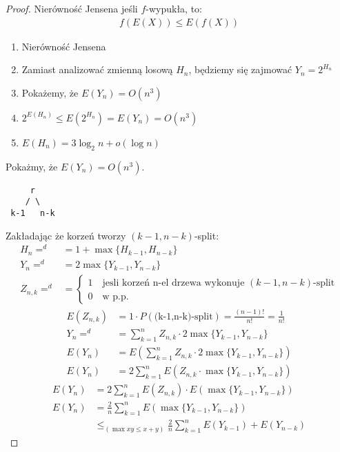 \documentclass{article}
\numberwithin{equation}{subsection}
\begin{document}
\begin{proof}
Nierówność Jensena jeśli $f$-wypukła, to:
\begin{align}
    f(E(X)) \leq E(f(X))
\end{align}

\begin{enumerate}
    \item Nierówność Jensena
    \item Zamiast analizować zmienną losową $H_n$, będziemy się zajmować $Y_n=2^{H_n}$
    \item Pokażemy, że $E(Y_n) = O(n^3)$
    \item $2^{E(H_n)} \leq E(2^{H_n}) = E(Y_n) = O(n^3)$
    \item $E(H_n) = 3\log_2 n + o(\log n)$
\end{enumerate}
Pokażmy, że $E(Y_n) = O(n^3)$.
\begin{verbatim}
     r
    / \
 k-1   n-k
\end{verbatim}
\noindent
Zakładając że korzeń tworzy $(k-1,n-k)$-split:
\begin{align}
    H_n =^{d}  &= 1 + \max\{H_{k-1}, H_{n-k}\}\\
    Y_n =^{d}  &= 2 \max\{Y_{k-1}, Y_{n-k}\}\\
    Z_{n,k} =^{d} &= \begin{cases}
        1 \quad \text{jesli korzeń n-el drzewa wykonuje } (k-1,n-k)\text{-split}\\
        0 \quad \text{w p.p.}
    \end{cases}
\end{align}
\begin{align}
    E(Z_{n,k}) &= 1\cdot P(\text{(k-1,n-k)-split})=\frac{(n-1)!}{n!}=\frac{1}{n!}\\
    Y_n =^{d} &= \sum_{k=1}^{n} Z_{n,k} \cdot 2 \max\{Y_{k-1}, Y_{n-k}\}\\
    E(Y_n) &= E\left(\sum_{k=1}^{n} Z_{n,k} \cdot 2\max\{Y_{k-1}, Y_{n-k}\}\right)\\
    E(Y_n) &= 2\sum_{k=1}^{n} E\left(Z_{n,k} \cdot \max\{Y_{k-1}, Y_{n-k}\}\right)
\end{align}
\begin{align}
    E(Y_n) &= 2\sum_{k=1}^{n} E(Z_{n,k}) \cdot E\left(\max\{Y_{k-1}, Y_{n-k}\}\right)\\
    E(Y_n) &= \frac{2}{n} \sum_{k=1}^{n} E(\max\{Y_{k-1}, Y_{n-k}\})\\
    &\leq_{(\max xy \leq x+y)} \frac{2}{n} \sum_{k=1}^{n} E(Y_{k-1}) + E(Y_{n-k})
\end{align}

\end{proof}
\end{document}

